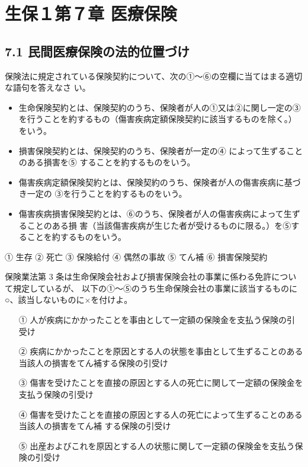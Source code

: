 \documentclass[report,gutter=10mm,fore-edge=10mm,uplatex,dvipdfmx]{jlreq}
\begin{document}
\chapter{生保１第７章 医療保険}
\section{7.1 民間医療保険の法的位置づけ}

保険法に規定されている保険契約について、次の①～⑥の空欄に当てはまる適切な語句を答えなさ
い。
\begin{itemize}
 \item 生命保険契約とは、保険契約のうち、保険者が人の①又は②に関し一定の③を行うことを約するもの（傷害疾病定額保険契約に該当するものを除く。）をいう。
 \item 損害保険契約とは、保険契約のうち、保険者が一定の④
によって生ずることのある損害を⑤
することを約するものをいう。
 \item 傷害疾病定額保険契約とは、保険契約のうち、保険者が人の傷害疾病に基づき一定の
③を行うことを約するものをいう。
 \item 傷害疾病損害保険契約とは、⑥のうち、保険者が人の傷害疾病によって生ずることのある損
害（当該傷害疾病が生じた者が受けるものに限る。）を⑤することを約するものをいう。
\end{itemize}


① 生存
② 死亡
③ 保険給付
④ 偶然の事故
⑤ てん補
⑥ 損害保険契約

保険業法第 3 条は生命保険会社および損害保険会社の事業に係わる免許について規定しているが、
以下の①～⑤のうち生命保険会社の事業に該当するものに○、該当しないものに×を付けよ。

\begin{itemize}
 \item [①] 人が疾病にかかったことを事由として一定額の保険金を支払う保険の引受け
 \item [②]
疾病にかかったことを原因とする人の状態を事由として生ずることのある当該人の損害をてん補する保険の引受け
 \item [③]
傷害を受けたことを直接の原因とする人の死亡に関して一定額の保険金を支払う保険の引受け
 \item [④]
傷害を受けたことを直接の原因とする人の死亡によって生ずることのある当該人の損害をてん補
する保険の引受け
 \item [⑤]
出産およびこれを原因とする人の状態に関して一定額の保険金を支払う保険の引受け
\end{itemize}
\end{document}
